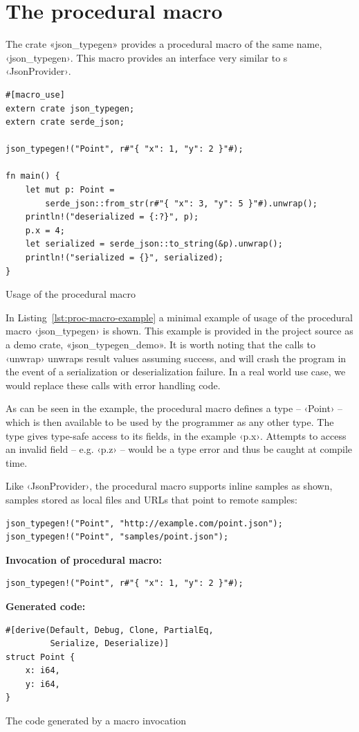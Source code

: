 \section{The procedural macro}

The crate «json_typegen» provides a procedural macro of the same name, ‹json_typegen›. This macro provides an interface very similar to {\fsharpdata}s ‹JsonProvider›.

\begin{listing}[ht!]
\begin{verbatim}
#[macro_use]
extern crate json_typegen;
extern crate serde_json;

json_typegen!("Point", r#"{ "x": 1, "y": 2 }"#);

fn main() {
    let mut p: Point =
        serde_json::from_str(r#"{ "x": 3, "y": 5 }"#).unwrap();
    println!("deserialized = {:?}", p);
    p.x = 4;
    let serialized = serde_json::to_string(&p).unwrap();
    println!("serialized = {}", serialized);
}
\end{verbatim}
\caption{Usage of the procedural macro}
\label{lst:proc-macro-example}
\end{listing}

In Listing~\ref{lst:proc-macro-example} a minimal example of usage of the procedural macro ‹json_typegen› is shown. This example is provided in the project source as a demo crate, «json_typegen_demo». It is worth noting that the calls to ‹unwrap› unwraps result values assuming success, and will crash the program in the event of a serialization or deserialization failure. In a real world use case, we would replace these calls with error handling code.

As can be seen in the example, the procedural macro defines a type -- ‹Point› -- which is then available to be used by the programmer as any other type. The type gives type-safe access to its fields, in the example ‹p.x›. Attempts to access an invalid field -- e.g. ‹p.z› -- would be a type error and thus be caught at compile time.

Like ‹JsonProvider›, the procedural macro supports inline samples as shown, samples stored as local files and URLs that point to remote samples:

\begin{verbatim}
json_typegen!("Point", "http://example.com/point.json");
json_typegen!("Point", "samples/point.json");
\end{verbatim}

\begin{listing}[ht!]
\textbf{Invocation of procedural macro:}
\begin{verbatim}
json_typegen!("Point", r#"{ "x": 1, "y": 2 }"#);
\end{verbatim}
\vspace{5mm}

\textbf{Generated code:}
\begin{verbatim}
#[derive(Default, Debug, Clone, PartialEq,
         Serialize, Deserialize)]
struct Point {
    x: i64,
    y: i64,
}
\end{verbatim}
\caption{The code generated by a macro invocation}
\label{lst:basic-macro-output}
\end{listing}

